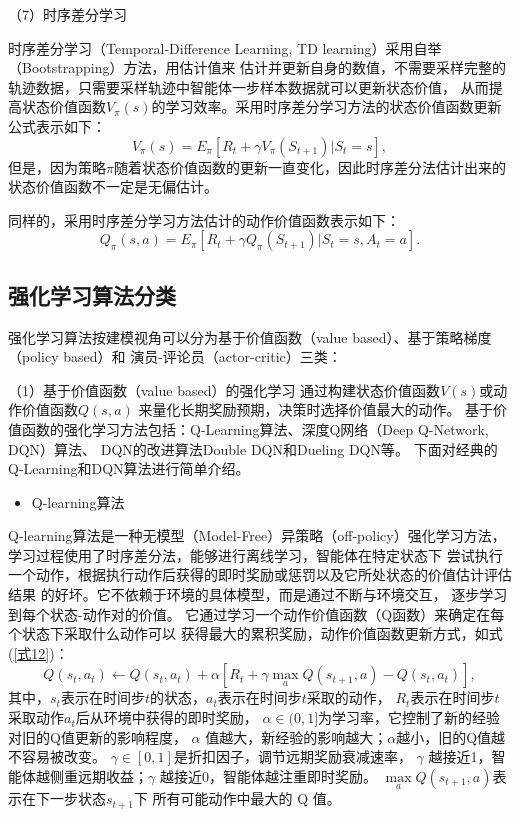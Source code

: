（7）时序差分学习

时序差分学习（Temporal-Difference Learning, TD learning）采用自举（Bootstrapping）方法，用估计值来
估计并更新自身的数值，不需要采样完整的轨迹数据，只需要采样轨迹中智能体一步样本数据就可以更新状态价值，
从而提高状态价值函数$V_{\pi }( s)$的学习效率。采用时序差分学习方法的状态价值函数更新公式表示如下：
\begin{equation}\label{式10}
    V_{\pi }( s) =  E_{\pi}[R_{t} + \gamma V_{\pi }( S_{t+1}) | S_{t}=s],
\end{equation}
但是，因为策略$\pi $随着状态价值函数的更新一直变化，因此时序差分法估计出来的状态价值函数不一定是无偏估计。

同样的，采用时序差分学习方法估计的动作价值函数表示如下：
\begin{equation}\label{式11}
    Q_{\pi }( s,a) =  E_{\pi}[R_{t} + \gamma Q_{\pi }( S_{t+1}) | S_{t}=s,A_{t}=a].
\end{equation}
\subsection{强化学习算法分类}

强化学习算法按建模视角可以分为基于价值函数（value based）、基于策略梯度（policy based）和
演员-评论员（actor-critic）三类：



（1）基于价值函数（value based）的强化学习
通过构建状态价值函数$V(s)$或动作价值函数$Q(s,a)$
来量化长期奖励预期，决策时选择价值最大的动作。
基于价值函数的强化学习方法包括：Q-Learning算法\cite{watkins1992q}、深度Q网络（Deep Q-Network, DQN）算法\cite{mnih2015human}、
DQN的改进算法Double DQN\cite{van2016deep}和Dueling DQN\cite{wang2016dueling}等。
下面对经典的Q-Learning和DQN算法进行简单介绍。

\begin{itemize}
    \item Q-learning算法
\end{itemize}

Q-learning算法是一种无模型（Model-Free）异策略（off-policy）强化学习方法，
学习过程使用了时序差分法，能够进行离线学习，智能体在特定状态下
尝试执行一个动作，根据执行动作后获得的即时奖励或惩罚以及它所处状态的价值估计评估结果
的好坏。它不依赖于环境的具体模型，而是通过不断与环境交互，
逐步学习到每个状态-动作对的价值。
它通过学习一个动作价值函数（Q函数）来确定在每个状态下采取什么动作可以
获得最大的累积奖励，动作价值函数更新方式，如式(\ref{式12})：
\begin{equation}\label{式12}
    Q( s_{t},a_{t}) \leftarrow Q( s_{t},a_{t}) + \alpha [ R_{t}+\gamma\underset{a}{\max}Q( s_{t+1},a) - Q( s_{t},a_{t})],
\end{equation}
其中，$s_{t} $表示在时间步$ t$的状态，$a_{t}$表示在时间步$t$采取的动作，
$ R_{t}$表示在时间步$t$采取动作$a_{t}$后从环境中获得的即时奖励，
$\alpha \in (0,1]$为学习率，它控制了新的经验对旧的Q值更新的影响程度，
$\alpha$ 值越大，新经验的影响越大；$\alpha$越小，旧的Q值越不容易被改变。
$\gamma \in [0,1]$是折扣因子，调节远期奖励衰减速率，
$\gamma$ 越接近1，智能体越侧重远期收益；$\gamma$ 越接近0，智能体越注重即时奖励。
$\underset{a}{\max}Q( s_{t+1},a) $表示在下一步状态$s_{t+1}$下
所有可能动作中最大的 Q 值。

